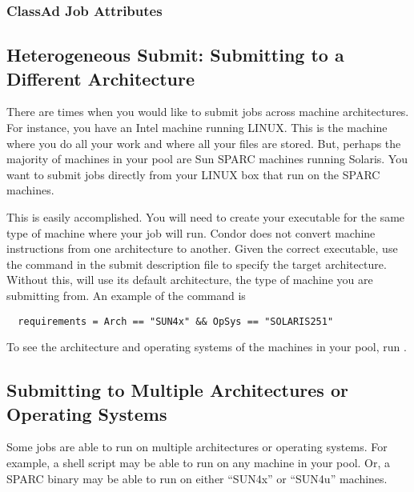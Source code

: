 \subsubsection{\label{user-man-machad}ClassAd Job Attributes}




\subsection{Heterogeneous Submit: Submitting to a Different Architecture} 

There are times when you would like to submit jobs across machine
architectures. For instance, you have an Intel machine running
LINUX. This is the machine where you do all your
work and where all your files are stored. But, perhaps the majority of
machines in your pool are Sun SPARC machines running Solaris. You
want to submit jobs directly from your LINUX box that run on the
SPARC machines.

This is easily accomplished.  You will need to create your
executable for the same type of machine where your job will run.
Condor does not convert machine instructions from one architecture
to another. 
Given the correct executable, use the
 command in
the submit description file to
specify the target architecture.
Without this, 
will use its default architecture, 
the type of machine you are submitting from.
An example of the command is
\begin{verbatim}
  requirements = Arch == "SUN4x" && OpSys == "SOLARIS251"
\end{verbatim}
To see the architecture and operating systems of the machines
in your pool,
run .

\subsection{Submitting to Multiple Architectures or Operating Systems} 


Some jobs are able to run on multiple architectures or operating
systems.  For example, a shell script may be able to run on any
machine in your pool.  Or, a SPARC binary may be able to run on either
``SUN4x'' or ``SUN4u'' machines.

